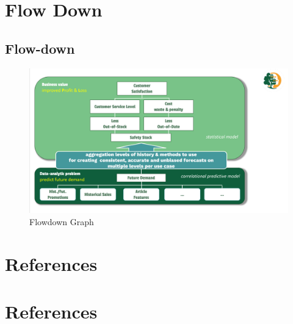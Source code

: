 \documentclass[
  american,
  10,
  a4paper,
]{book}
\theoremstyle{definition}
\theoremstyle{remark}
\begin{document}
\chapter{Flow Down}\label{flow-down}

\section{Flow-down}\label{sec-flowdown}

\begin{figure}[H]

\caption{Flowdown Graph}

{\centering \includegraphics[width=1\linewidth,height=\textheight,keepaspectratio]{nb/../images/flowdown.png}

}

\end{figure}%

\chapter{References}\label{references}

\chapter*{References}\label{references-1}

\end{document}
